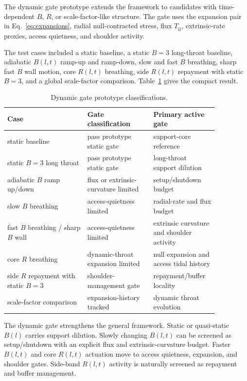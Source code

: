 \documentclass[11pt]{article}
\begin{document}
The dynamic gate prototype extends the framework to candidates with time-dependent $B$, $R$, or scale-factor-like structure.  The gate uses the expansion pair in Eq.~\eqref{eq:expansions}, radial null-contracted stress, flux $T_{\hat t\hat l}$, extrinsic-rate proxies, access quietness, and shoulder activity.

The test cases included a static baseline, a static $B=3$ long-throat baseline, adiabatic $B(l,t)$ ramp-up and ramp-down, slow and fast $B$ breathing, sharp fast $B$ wall motion, core $R(l,t)$ breathing, side $R(l,t)$ repayment with static $B=3$, and a global scale-factor comparison.  Table~\ref{tab:dynamic} gives the compact result.

\begin{table}[ht]
\centering
\caption{Dynamic gate prototype classifications.}
\label{tab:dynamic}
\begin{tabular}{p{0.34\linewidth}p{0.28\linewidth}p{0.24\linewidth}}
\toprule
Case & Gate classification & Primary active gate \\
\midrule
static baseline & pass prototype static gate & support-core reference \\
static $B=3$ long throat & pass prototype static gate & long-throat support dilution \\
adiabatic $B$ ramp up/down & flux or extrinsic-curvature limited & setup/shutdown budget \\
slow $B$ breathing & access-quietness limited & radial-rate and flux budget \\
fast $B$ breathing / sharp $B$ wall & access-quietness limited & extrinsic curvature and shoulder activity \\
core $R$ breathing & dynamic-throat expansion limited & null expansion and access tidal history \\
side $R$ repayment with static $B=3$ & shoulder-management gate & repayment/buffer locality \\
scale-factor comparison & expansion-history tracked & dynamic throat evolution \\
\bottomrule
\end{tabular}
\end{table}

The dynamic gate strengthens the general framework.  Static or quasi-static $B(l)$ carries support dilution.  Slowly changing $B(l,t)$ can be screened as setup/shutdown with an explicit flux and extrinsic-curvature budget.  Faster $B(l,t)$ and core $R(l,t)$ actuation move to access quietness, expansion, and shoulder gates.  Side-band $R(l,t)$ activity is naturally screened as repayment and buffer management.
\end{document}
